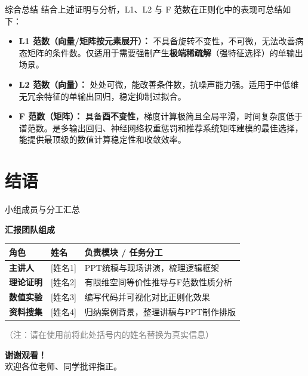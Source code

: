 \documentclass[aspectratio=169]{beamer}
\begin{document}
\begin{frame}{综合总结}
    结合上述证明与分析，L1、L2 与 F 范数在正则化中的表现可总结如下：
    
    \begin{itemize}
        \item \textbf{L1 范数（向量/矩阵按元素展开）：} 不具备旋转不变性，不可微，无法改善病态矩阵的条件数。仅适用于需要强制产生\textbf{极端稀疏解}（强特征选择）的单输出场景。
        \vspace{0.3cm}
        \item \textbf{L2 范数（向量）：} 处处可微，能改善条件数，抗噪声能力强。适用于中低维无冗余特征的单输出回归，稳定抑制过拟合。
        \vspace{0.3cm}
        \item \textbf{F 范数（矩阵）：} 具备\textbf{酉不变性}，梯度计算极简且全局平滑，时间复杂度低于谱范数。是多输出回归、神经网络权重惩罚和推荐系统矩阵建模的最佳选择，能提供最顶级的数值计算稳定性和收敛效率。
    \end{itemize}
\end{frame}


\section*{结语}

\begin{frame}{小组成员与分工汇总}
    \begin{center}
        \Large{\textbf{汇报团队组成}}
    \end{center}
    \vspace{0.5cm}
    
    \begin{table}[h]
        \centering
        \renewcommand{\arraystretch}{1.5}
        \begin{tabular}{p{3cm} p{3cm} p{6cm}}
            \toprule
            \textbf{角色} & \textbf{姓名} & \textbf{负责模块 / 任务分工} \\
            \midrule
            \textbf{主讲人} & [姓名1] & PPT统稿与现场讲演，梳理逻辑框架 \\
            \textbf{理论证明} & [姓名2] & 有限维空间等价性推导与F范数性质分析 \\
            \textbf{数值实验} & [姓名3] & 编写代码并可视化对比正则化效果 \\
            \textbf{资料搜集} & [姓名4] & 归纳案例背景，整理讲稿与PPT制作排版 \\
            \bottomrule
        \end{tabular}
    \end{table}
    
    \vspace{0.5cm}
    \begin{center}
        \textcolor{gray}{\small （注：请在使用前将此处括号内的姓名替换为真实信息）}
    \end{center}
\end{frame}

\begin{frame}
    \begin{center}
        \Huge{\textbf{谢谢观看！}}\\[0.5cm]
        \large{欢迎各位老师、同学批评指正。}
    \end{center}
\end{frame}
\end{document}
